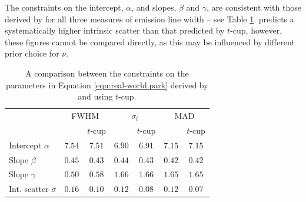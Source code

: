 \documentclass[fleqn,usenatbib]{rasti}
\begin{document}
The constraints on the intercept, $\alpha$, and slopes, $\beta$ and $\gamma$,
are consistent with those derived by \citet{Park:2017} for all three measures of
emission line width -- see Table \ref{tab:real-world.park.params}.
\citet{Park:2017} predicts a systematically higher intrinsic scatter than that
predicted by $t$-cup, however, these figures cannot be compared directly, as
this may be influenced by different prior choice for $\nu$.

\begin{table}
	\centering
	\caption{A comparison between the constraints on the parameters in Equation
	\ref{eqn:real-world.park} derived by \citet{Park:2017} and using $t$-cup.}
	\label{tab:real-world.park.params}
	\begin{tabular}{lcc|cc|cc} %
                          & \multicolumn{2}{c}{FWHM} & \multicolumn{2}{c}{$\sigma_l$} & \multicolumn{2}{c}{MAD} \\
                          & \citet{Park:2017} & $t$-cup & \citet{Park:2017} & $t$-cup & \citet{Park:2017} & $t$-cup \\
    Intercept $\alpha$    & $7.54$\raisebox{0.5ex}{\tiny$^{+0.26}_{-0.27}$} & $7.51$\raisebox{0.5ex}{\tiny$^{+0.22}_{-0.22}$} & $6.90$\raisebox{0.5ex}{\tiny$^{+0.35}_{-0.34}$} & $6.91$\raisebox{0.5ex}{\tiny$^{+0.30}_{-0.31}$} & $7.15$\raisebox{0.5ex}{\tiny$^{+0.24}_{-0.25}$} & $7.15$\raisebox{0.5ex}{\tiny$^{+0.22}_{-0.22}$} \\
    Slope $\beta$         & $0.45$\raisebox{0.5ex}{\tiny$^{+0.08}_{-0.08}$} & $0.43$\raisebox{0.5ex}{\tiny$^{+0.06}_{-0.06}$} & $0.44$\raisebox{0.5ex}{\tiny$^{+0.07}_{-0.07}$} & $0.43$\raisebox{0.5ex}{\tiny$^{+0.05}_{-0.06}$} & $0.42$\raisebox{0.5ex}{\tiny$^{+0.07}_{-0.07}$} & $0.42$\raisebox{0.5ex}{\tiny$^{+0.05}_{-0.06}$} \\
    Slope $\gamma$        & $0.50$\raisebox{0.5ex}{\tiny$^{+0.55}_{-0.53}$} & $0.58$\raisebox{0.5ex}{\tiny$^{+0.44}_{-0.45}$} & $1.66$\raisebox{0.5ex}{\tiny$^{+0.65}_{-0.66}$} & $1.66$\raisebox{0.5ex}{\tiny$^{+0.57}_{-0.58}$} & $1.65$\raisebox{0.5ex}{\tiny$^{+0.61}_{-0.62}$} & $1.65$\raisebox{0.5ex}{\tiny$^{+0.55}_{-0.55}$} \\
    Int. scatter $\sigma$ & $0.16$\raisebox{0.5ex}{\tiny$^{+0.10}_{-0.08}$} & $0.10$\raisebox{0.5ex}{\tiny$^{+0.03}_{-0.10}$} & $0.12$\raisebox{0.5ex}{\tiny$^{+0.09}_{-0.06}$} & $0.08$\raisebox{0.5ex}{\tiny$^{+0.02}_{-0.08}$} & $0.12$\raisebox{0.5ex}{\tiny$^{+0.09}_{-0.06}$} & $0.07$\raisebox{0.5ex}{\tiny$^{+0.02}_{-0.07}$} \\
    \end{tabular}
\end{table}
\end{document}

